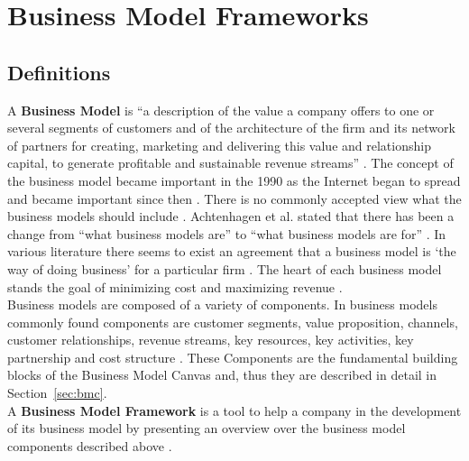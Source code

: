 \section{Business Model Frameworks}
\label{sec:bmf}	
	\subsection{Definitions} 
		 A \textbf{Business Model} is ``a description of the value a company offers to one or several segments of customers and of the architecture of the firm and its network of partners for creating, marketing and delivering this value and relationship capital, to generate profitable and sustainable revenue streams'' \todo{[osterwalder 2005]}. The concept of the business model became important in the 1990 as the Internet began to spread and became important since then \todo{[22]}. There is no commonly accepted view what the business models should include . Achtenhagen et al. stated that there has been a change from ``what business models are'' to ``what business models are for'' \cite{westerlund}. In various literature there seems to exist an agreement that a business model is `the way of doing business' for a particular firm \cite{westerlund}. The heart of each business model stands the goal of minimizing cost and maximizing revenue \cite{ju}.\\
		 Business models are composed of a variety of components. In business models commonly found components are customer segments, value proposition, channels, customer relationships, revenue streams, key resources, key activities, key partnership and cost structure \todo{[osterwalder 2005]}. These Components are the fundamental building blocks of the Business Model Canvas and, thus they are described in detail in Section~\ref{sec:bmc}. \\

		 A \textbf{Business Model Framework} is a tool to help a company in the development of its business model by presenting an overview over the business model components described above \cite{dijkman}.

